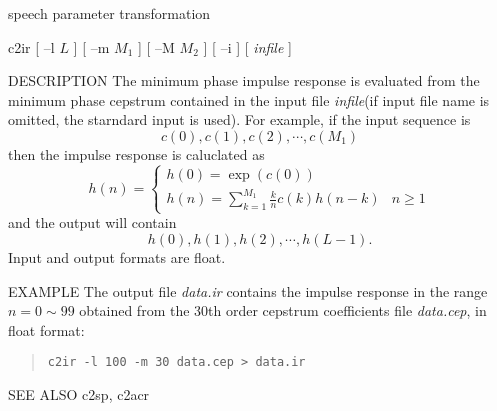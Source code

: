 %
{speech parameter transformation}

\begin{synopsis}
 \item[c2ir] [ --l $L$ ] [ --m $M_1$ ] [ --M $M_2$ ] [ --i ] [ {\em infile} ]
\end{synopsis}

\begin{qsection}{DESCRIPTION}
The minimum phase impulse response is evaluated from the minimum phase
cepstrum contained in the input file {\em infile}(if input file name
is omitted, the starndard input is used).
For example, if the input sequence is
\[c(0),c(1),c(2),\cdots,c(M_1)\]
then the impulse response is caluclated as
\[ h(n)=\left\{
\begin{array}{lc}
 h(0)=\exp(c(0))&\\
 h(n)=\displaystyle \sum_{k=1}^{M_1} \frac{k}{n}c(k)h(n-k)& n \geq 1
\end{array}
\right. \]
and the output will contain
\[ h(0),h(1),h(2),\cdots,h(L -1). \]
Input and output formats are float.
\end{qsection}

\begin{options}
\end{options}

\begin{qsection}{EXAMPLE}
The output file {\em data.ir} contains the impulse response
in the range $n = 0 \sim 99$ obtained from the 30th order cepstrum
coefficients file {\em data.cep}, in float format:
 \begin{quote}
  \verb!c2ir -l 100 -m 30 data.cep > data.ir!
 \end{quote}
\end{qsection}

\begin{qsection}{SEE ALSO}
 c2sp, c2acr
\end{qsection}
